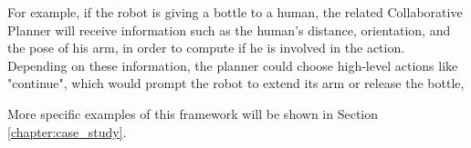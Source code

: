 For example, if the robot is giving a bottle to a human, the related Collaborative Planner will receive information such as the human's distance, orientation, and the pose of his arm, in order to compute if he is involved in the action. Depending on these information, the planner could choose high-level actions like "continue", which would prompt the robot to extend its arm or release the bottle, 

More specific examples of this framework will be shown in Section \ref{chapter:case_study}.
